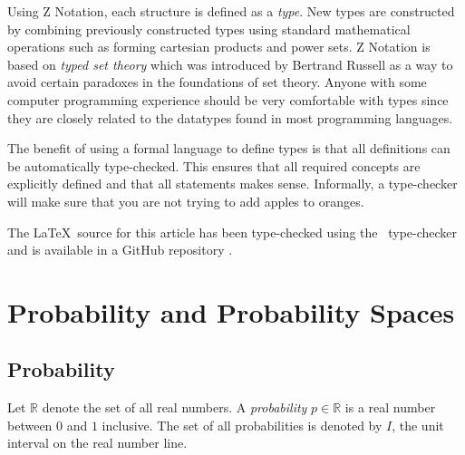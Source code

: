 \documentclass{article}
\begin{document}
Using Z Notation, each structure is defined as a {\it type}.
New types are constructed by combining previously constructed types using standard mathematical operations such as forming cartesian products and power sets.
Z Notation is based on {\it typed set theory} which was introduced by Bertrand Russell as a way to avoid certain paradoxes in the foundations
of set theory.
Anyone with some computer programming experience should be very comfortable with types since they are closely related to the datatypes
found in most programming languages.

The benefit of using a formal language to define types is that all definitions can be automatically type-checked.
This ensures that all required concepts are explicitly defined and that all statements makes sense.
Informally, a type-checker will make sure that you are not trying to add apples to oranges.

The \LaTeX\ source for this article has been type-checked using the \fuzz\ type-checker \cite{spivey:fuzz}
and is available in a GitHub repository \cite{agryman:probability-and-statistics}.

\section{Probability and Probability Spaces}

\subsection{Probability}

\newcommand{\real}{\mathbb{R}}


Let $\real$ denote the set of all real numbers.
A {\it probability} $p \in \real$ is a real number between $0$ and $1$ inclusive.
The set of all probabilities is denoted by $I$, the unit interval on the real number line.

\newcommand{\realzero}{0}

\newcommand{\realone}{1}


\newcommand{\reallt}{<}
\newcommand{\realleq}{\leq}
\newcommand{\realgt}{>}
\newcommand{\realgeq}{\geq}
\end{document}
